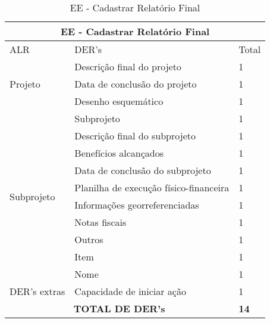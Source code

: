 \begin{table}[]
\centering
\caption{EE - Cadastrar Relatório Final}
\label{ee_cadastrar_relatório_final}
\begin{tabular}{|l|l|l|}
\hline
\multicolumn{3}{|c|}{EE - Cadastrar Relatório Final}                                                                 \\ \hline
ALR                           & DER's                                                & Total              \\ \hline
\multirow{3}{*}{Projeto}     & Descrição final do projeto             & 1 \\ \cline{2-3}
                             & Data de conclusão do projeto           & 1 \\ \cline{2-3}
                             & Desenho esquemático                    & 1 \\ \cline{2-3} \hline
\multirow{10}{*}{Subprojeto} & Subprojeto                             & 1 \\ \cline{2-3}
                             & Descrição final do subprojeto          & 1 \\ \cline{2-3}
                             & Benefícios alcançados                  & 1 \\ \cline{2-3}
                             & Data de conclusão do subprojeto        & 1 \\ \cline{2-3}
                             & Planilha de execução físico-financeira & 1 \\ \cline{2-3}
                             & Informações georreferenciadas          & 1 \\ \cline{2-3}
                             & Notas fiscais                          & 1 \\ \cline{2-3}
                             & Outros                                 & 1 \\ \cline{2-3}
                             & Item                                   & 1 \\ \cline{2-3} \hline
                             & Nome                                   & 1 \\ \cline{2-3}
DER's extras                 & Capacidade de iniciar ação             & 1 \\ \hline
\multicolumn{2}{|c|}{\textbf{TOTAL DE DER's}}                                                 & \textbf{14}                 \\ \hline
\end{tabular}
\end{table}
  
